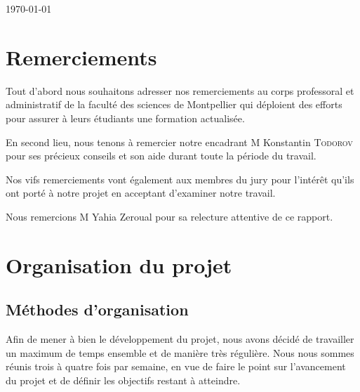 \documentclass[oneside,13pt,a4paper]{report}
\begin{document}
\begin{titlepage}
	\par\vspace{1cm}

	\vfill

	{\large \today\par}
\end{titlepage}





\parskip=5pt
\chapter*{Remerciements}
\begin{center}

	Tout d'abord nous souhaitons adresser nos remerciements au corps professoral et administratif de la faculté des sciences de Montpellier qui déploient des efforts pour assurer à leurs étudiants une formation actualisée.

	En second lieu, nous tenons à remercier notre encadrant M Konstantin \textsc{Todorov} pour ses précieux conseils et son aide durant toute la période du travail.

	Nos vifs remerciements vont également aux membres du jury pour l’intérêt qu’ils ont porté à notre projet en acceptant d’examiner notre travail.

	Nous remercions M Yahia Zeroual pour sa relecture attentive de ce rapport.

\end{center}

\parskip=0pt
\tableofcontents

\parskip=5pt

\chapter{Organisation du projet}
\section{Méthodes d’organisation}

Afin de mener à bien le développement du projet, nous avons décidé de travailler un maximum de temps ensemble et de manière très régulière. Nous nous sommes réunis trois à quatre fois par semaine, en vue de faire le point sur l'avancement du projet et de définir les objectifs restant à atteindre.
\end{document}
